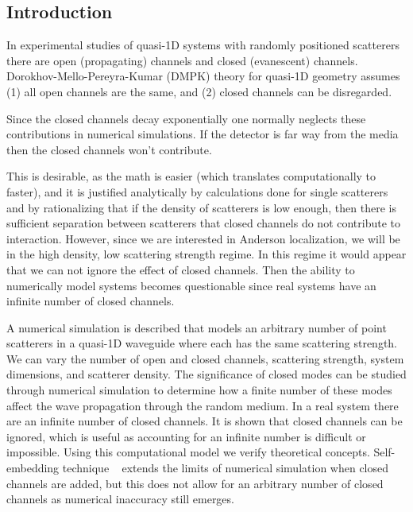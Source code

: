 \subsection {Introduction}

In experimental studies of quasi-1D systems with randomly positioned 
scatterers there are open (propagating) channels and closed (evanescent)
channels.  
Dorokhov-Mello-Pereyra-Kumar (DMPK) theory 
for quasi-1D geometry assumes
(1) all open channels are the same, and (2) closed channels can be disregarded.

Since the closed channels decay exponentially one normally
neglects these contributions in numerical simulations. If the detector is far way from the media
then the closed channels won't contribute. 

This is desirable, as the math is easier 
(which translates computationally to faster), and it is justified analytically
by calculations done for single scatterers~\cite{1990_Bagwell}~\cite{1991_Kumar_Bagwell}
and by rationalizing that if the density of scatterers is low enough, then 
there is sufficient separation between scatterers that closed channels do 
not contribute to interaction. However, since we are interested in Anderson 
localization, we will be in the high density, low scattering strength regime.
In this regime it would appear that we can not ignore the effect
of closed channels.  Then the ability to numerically model systems becomes
questionable since real systems have an infinite number of closed channels.

A numerical simulation is described that models an arbitrary number of point scatterers
in a quasi-1D waveguide where each has the same scattering strength. 
We can vary the number of open and closed channels,
scattering strength, system dimensions, and scatterer density. 
The significance of closed modes can be studied through 
numerical simulation to determine how a finite number of these modes 
affect the wave propagation through the random medium.  In a real 
system there are an infinite number of closed channels.  It is
shown that closed channels can be ignored, which is useful as accounting for an infinite
number is difficult or impossible.
Using this computational model we verify theoretical concepts. Self-embedding 
technique
~\cite{1976_Bellman_Wing_embedding}
extends the limits of numerical simulation when closed channels are added, but this
does not allow for an arbitrary number of closed channels as numerical inaccuracy
still emerges.

